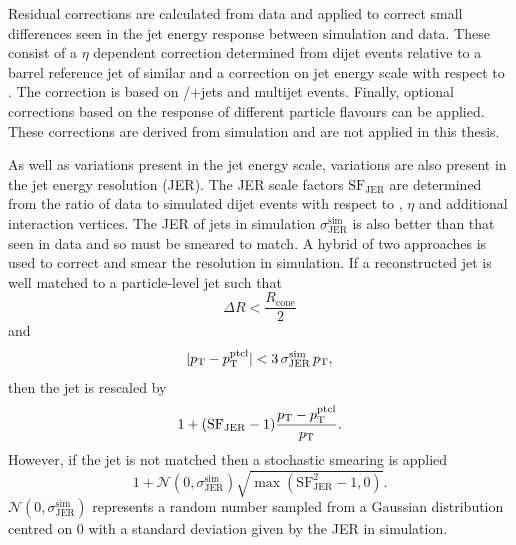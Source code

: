 Residual corrections are calculated from data and applied to correct small differences seen in the jet energy response between simulation and data.
These consist of a $\eta$ dependent correction determined from \QCD{} dijet events relative to a barrel reference jet of similar \pt{} and a correction on jet energy scale with respect to \pt{}.
The \pt{} correction is based on \Zboson/\photon{}+jets and \QCD{} multijet events. 
Finally, optional corrections based on the response of different particle flavours can be applied.
These corrections are derived from simulation and are not applied in this thesis.

As well as variations present in the jet energy scale, variations are also present in the jet energy resolution (JER).
The JER scale factors $\mathrm{SF}_{\mathrm{JER}}$ are determined from the ratio of data to simulated \QCD{} dijet events with respect to \pt{}, $\eta$ and additional interaction vertices.
The JER of jets in simulation $\sigma_\mathrm{JER}^{\mathrm{sim}}$ is also better than that seen in data and so must be smeared to match.
A hybrid of two approaches is used to correct and smear the resolution in simulation.
If a reconstructed jet is well matched to a particle-level jet such that 
\begin{equation*}
	\Delta R < \frac{R_\mathrm{cone}}{2}
\end{equation*}
and 
\begin{equation}
	\lvert p_{\mathrm{T}} - p_{\mathrm{T}}^\mathrm{ptcl} \rvert < 3\,\sigma_\mathrm{JER}^{\mathrm{sim}}\,p_{\mathrm{T}},
\end{equation}
 then the jet \pt{} is rescaled by
\begin{equation*}
	1+(\mathrm{SF}_{\mathrm{JER}}-1)\frac{p_{\mathrm{T}}-p_{\mathrm{T}}^{\mathrm{ptcl}}}{p_{\mathrm{T}}}.
\end{equation*}
However, if the jet is not matched then a stochastic smearing is applied
\begin{equation*}
	1 + \mathcal N(0,\sigma_\mathrm{JER}^{\mathrm{sim}}) \sqrt{\max(\mathrm{SF}_{\mathrm{JER}}^2 - 1, 0)}.
\end{equation*}
$\mathcal N(0,\sigma_\mathrm{JER}^{\mathrm{sim}})$ represents a random number sampled from a Gaussian distribution centred on 0 with a standard deviation given by the JER in simulation.


